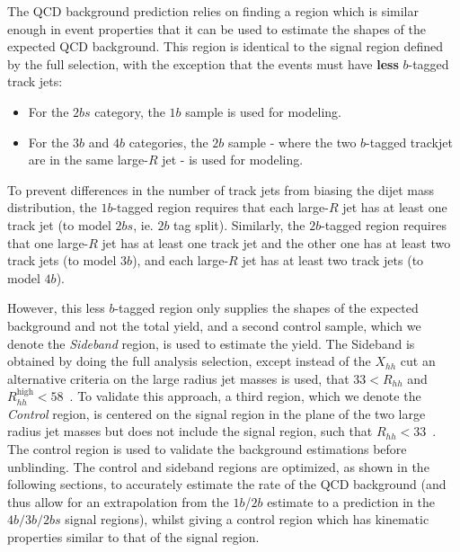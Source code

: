 The QCD background prediction relies on finding a region which is similar enough in event properties that it can be used to estimate the shapes of the expected QCD background.  This region is identical to the signal region defined by the full selection, with the exception that the events must have \textbf{less} $b$-tagged track jets:
\begin{itemize}
\item For the $2bs$ category, the $1b$ sample is used for modeling.
\item For the $3b$ and $4b$ categories, the $2b$ sample - where the two $b$-tagged trackjet are in the same large-$R$ jet - is used for modeling.
\end{itemize}
To prevent differences in the number of track jets from biasing the dijet mass distribution, the $1b$-tagged region requires that each large-$R$ jet has at least one track jet (to model $2bs$, ie. $2b$ tag split). Similarly, the $2b$-tagged region requires that one large-$R$ jet has at least one track jet and the other one has at least two track jets (to model $3b$), and each large-$R$ jet has at least two track jets (to model $4b$).

However, this less $b$-tagged region only supplies the shapes of the expected background and not the total yield, and a second control sample, which we denote the \textit{Sideband} region, is used to estimate the yield. The Sideband is obtained by doing the full analysis selection, except instead of the $X_{hh}$ cut an alternative criteria on the large radius jet masses is used, that $33 < R_{hh} $ and $R_{hh}^{\text{high}} < 58$~\GeV. To validate this approach, a third region, which we denote the \textit{Control} region, is centered on the signal region in the plane of the two large radius jet masses but does not include the signal region, such that $R_{hh} < 33$~\GeV.  The control region is used to validate the background estimations before unblinding. The control and sideband regions are optimized, as shown in the following sections, to accurately estimate the rate of the QCD background (and thus allow for an extrapolation from the $1b$/$2b$ estimate to a prediction in the $4b/3b/2bs$  signal regions), whilst giving a control region which has kinematic properties similar to that of the signal region. 







